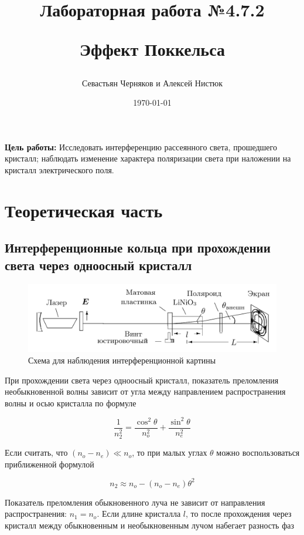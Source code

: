 \documentclass{article}
\title{\begin{center}Лабораторная работа №4.7.2\end{center}
Эффект Поккельса}
\author{Севастьян Черняков и Алексей Нистюк}
\date{\today}
\begin{document}
\maketitle
{}

\textbf{Цель работы:} Исследовать интерференцию рассеянного света, прошедшего кристалл; наблюдать изменение характера поляризации света при наложении на кристалл электрического поля.

\section{Теоретическая часть}
\subsection{Интерференционные кольца при прохождении света через одноосный кристалл}
\begin{figure}[h]
    \center\includegraphics[width = 0.8\linewidth]{ustanovka_kolca.png}
    \caption{Схема для наблюдения интерференционной картины}\label{fig:ustanovka_kolca}
\end{figure}

При прохождении света через одноосный кристалл, показатель преломления необыкновенной
волны зависит от угла между направлением распространения волны и осью кристалла
по формуле

\begin{equation}
    \frac{1}{n_2^2} = \frac{\cos^2 \theta}{n_o^2} + \frac{\sin^2 \theta}{n_e^2}
    \label{eq:pokazatel_prelomlenia}
\end{equation}

Если считать, что $(n_o - n_e) \ll n_o$, то при малых углах $\theta$ можно
воспользоваться приближенной формулой

\begin{equation}
    n_2 \approx n_o - (n_o - n_e) \theta^2
    \label{eq:pokazatel_prelomlenia_approx}
\end{equation}

Показатель преломления обыкновенного луча не зависит от направления распространения:
$n_1 = n_o$. Если длине кристалла $l$, то после прохождения через кристалл между
обыкновенным и необыкновенным лучом набегает разность фаз
\end{document}
